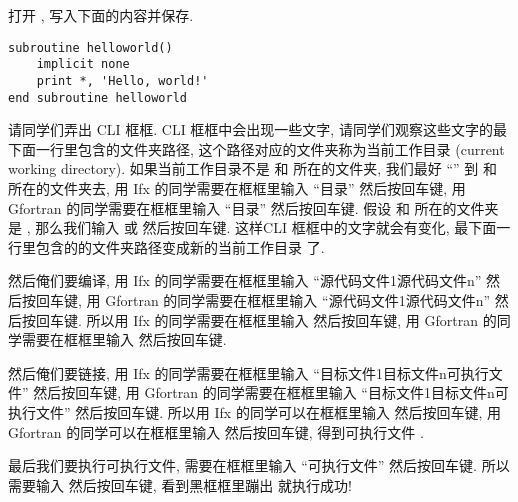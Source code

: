 打开 , 写入下面的内容并保存.
\begin{lstlisting}
subroutine helloworld()
    implicit none
    print *, 'Hello, world!'
end subroutine helloworld
\end{lstlisting}

请同学们弄出 CLI 框框. CLI 框框中会出现一些文字, 请同学们观察这些文字的最下面一行里包含的文件夹路径, 这个路径对应的文件夹称为当前工作目录 (current working directory). 如果当前工作目录不是  和  所在的文件夹, 我们最好 ``'' 到  和  所在的文件夹去, 用 Ifx 的同学需要在框框里输入 ``\textsf{目录}'' 然后按回车键, 用 Gfortran 的同学需要在框框里输入 ``\textsf{目录}'' 然后按回车键. 假设  和  所在的文件夹是 , 那么我们输入  或 然后按回车键. 这样CLI 框框中的文字就会有变化, 最下面一行里包含的的文件夹路径变成新的当前工作目录  了.

然后俺们要编译, 用 Ifx 的同学需要在框框里输入 ``\textsf{源代码文件$\!$1}\textsf{源代码文件$\!$n}'' 然后按回车键, 用 Gfortran 的同学需要在框框里输入 ``\textsf{源代码文件$\!$1}\textsf{源代码文件$\!$n}'' 然后按回车键. 所以用 Ifx 的同学需要在框框里输入  然后按回车键, 用 Gfortran 的同学需要在框框里输入  然后按回车键.

然后俺们要链接, 用 Ifx 的同学需要在框框里输入 ``\textsf{目标文件$\!$1}\textsf{目标文件$\!$n}\textsf{可执行文件}'' 然后按回车键, 用 Gfortran 的同学需要在框框里输入 ``\textsf{目标文件$\!$1}\textsf{目标文件$\!$n}\textsf{可执行文件}'' 然后按回车键. 所以用 Ifx 的同学可以在框框里输入  然后按回车键, 用 Gfortran 的同学可以在框框里输入  然后按回车键, 得到可执行文件 .

最后我们要执行可执行文件, 需要在框框里输入 ``\textsf{可执行文件}'' 然后按回车键. 所以需要输入  然后按回车键, 看到黑框框里蹦出  就执行成功!

